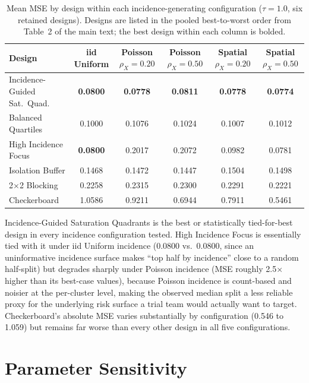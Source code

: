 \documentclass[11pt]{article}
\begin{document}
\begin{table}[h]
\centering
\small
\caption{Mean MSE by design within each incidence-generating configuration
($\tau=1.0$, six retained designs). Designs are listed in the pooled best-to-worst
order from Table~2 of the main text; the best design within each column is
bolded.}
\begin{tabular}{lccccc}
\toprule
Design & \shortstack{iid\\Uniform} & \shortstack{Poisson\\$\rho_X{=}0.20$} & \shortstack{Poisson\\$\rho_X{=}0.50$} & \shortstack{Spatial\\$\rho_X{=}0.20$} & \shortstack{Spatial\\$\rho_X{=}0.50$} \\
\midrule
Incidence-Guided Sat.\ Quad. & \textbf{0.0800} & \textbf{0.0778} & \textbf{0.0811} & \textbf{0.0778} & \textbf{0.0774} \\
Balanced Quartiles           & 0.1000 & 0.1076 & 0.1024 & 0.1007 & 0.1012 \\
High Incidence Focus         & \textbf{0.0800} & 0.2017 & 0.2072 & 0.0982 & 0.0781 \\
Isolation Buffer             & 0.1468 & 0.1472 & 0.1447 & 0.1504 & 0.1498 \\
2$\times$2 Blocking          & 0.2258 & 0.2315 & 0.2300 & 0.2291 & 0.2221 \\
Checkerboard                 & 1.0586 & 0.9211 & 0.6944 & 0.7911 & 0.5461 \\
\bottomrule
\end{tabular}
\end{table}

Incidence-Guided Saturation Quadrants is the best or statistically tied-for-best
design in every incidence configuration tested. High Incidence Focus is
essentially tied with it under iid Uniform incidence (0.0800 vs.\ 0.0800, since
an uninformative incidence surface makes ``top half by incidence'' close to a
random half-split) but degrades sharply under Poisson incidence (MSE roughly
2.5$\times$ higher than its best-case values), because Poisson incidence is
count-based and noisier at the per-cluster level, making the observed median
split a less reliable proxy for the underlying risk surface a trial team would
actually want to target. Checkerboard's absolute MSE varies substantially by
configuration (0.546 to 1.059) but remains far worse than every other design in
all five configurations.

\section{Parameter Sensitivity}
\label{sec:s8}
\end{document}
